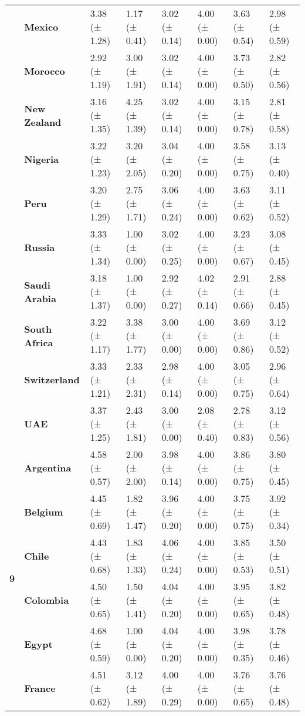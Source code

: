 \begin{tabular}{llllllll}
\textbf{} & \textbf{Mexico} & 3.38 (± 1.28) & 1.17 (± 0.41) & 3.02 (± 0.14) & 4.00 (± 0.00) & 3.63 (± 0.54) & 2.98 (± 0.59) \\
\textbf{} & \textbf{Morocco} & 2.92 (± 1.19) & 3.00 (± 1.91) & 3.02 (± 0.14) & 4.00 (± 0.00) & 3.73 (± 0.50) & 2.82 (± 0.56) \\
\textbf{} & \textbf{New Zealand} & 3.16 (± 1.35) & 4.25 (± 1.39) & 3.02 (± 0.14) & 4.00 (± 0.00) & 3.15 (± 0.78) & 2.81 (± 0.58) \\
\textbf{} & \textbf{Nigeria} & 3.22 (± 1.23) & 3.20 (± 2.05) & 3.04 (± 0.20) & 4.00 (± 0.00) & 3.58 (± 0.75) & 3.13 (± 0.40) \\
\textbf{} & \textbf{Peru} & 3.20 (± 1.29) & 2.75 (± 1.71) & 3.06 (± 0.24) & 4.00 (± 0.00) & 3.63 (± 0.62) & 3.11 (± 0.52) \\
\textbf{} & \textbf{Russia} & 3.33 (± 1.34) & 1.00 (± 0.00) & 3.02 (± 0.25) & 4.00 (± 0.00) & 3.23 (± 0.67) & 3.08 (± 0.45) \\
\textbf{} & \textbf{Saudi Arabia} & 3.18 (± 1.37) & 1.00 (± 0.00) & 2.92 (± 0.27) & 4.02 (± 0.14) & 2.91 (± 0.66) & 2.88 (± 0.45) \\
\textbf{} & \textbf{South Africa} & 3.22 (± 1.17) & 3.38 (± 1.77) & 3.00 (± 0.00) & 4.00 (± 0.00) & 3.69 (± 0.86) & 3.12 (± 0.52) \\
\textbf{} & \textbf{Switzerland} & 3.33 (± 1.21) & 2.33 (± 2.31) & 2.98 (± 0.14) & 4.00 (± 0.00) & 3.05 (± 0.75) & 2.96 (± 0.64) \\
\textbf{} & \textbf{UAE} & 3.37 (± 1.25) & 2.43 (± 1.81) & 3.00 (± 0.00) & 2.08 (± 0.40) & 2.78 (± 0.83) & 3.12 (± 0.56) \\
\cline{1-8}
\multirow[t]{19}{*}{\textbf{9}} & \textbf{Argentina} & 4.58 (± 0.57) & 2.00 (± 2.00) & 3.98 (± 0.14) & 4.00 (± 0.00) & 3.86 (± 0.75) & 3.80 (± 0.45) \\
\textbf{} & \textbf{Belgium} & 4.45 (± 0.69) & 1.82 (± 1.47) & 3.96 (± 0.20) & 4.00 (± 0.00) & 3.75 (± 0.75) & 3.92 (± 0.34) \\
\textbf{} & \textbf{Chile} & 4.43 (± 0.68) & 1.83 (± 1.33) & 4.06 (± 0.24) & 4.00 (± 0.00) & 3.85 (± 0.53) & 3.50 (± 0.51) \\
\textbf{} & \textbf{Colombia} & 4.50 (± 0.65) & 1.50 (± 1.41) & 4.04 (± 0.20) & 4.00 (± 0.00) & 3.95 (± 0.65) & 3.82 (± 0.48) \\
\textbf{} & \textbf{Egypt} & 4.68 (± 0.59) & 1.00 (± 0.00) & 4.04 (± 0.20) & 4.00 (± 0.00) & 3.98 (± 0.35) & 3.78 (± 0.46) \\
\textbf{} & \textbf{France} & 4.51 (± 0.62) & 3.12 (± 1.89) & 4.00 (± 0.29) & 4.00 (± 0.00) & 3.76 (± 0.65) & 3.76 (± 0.48) \\

\end{tabular}
